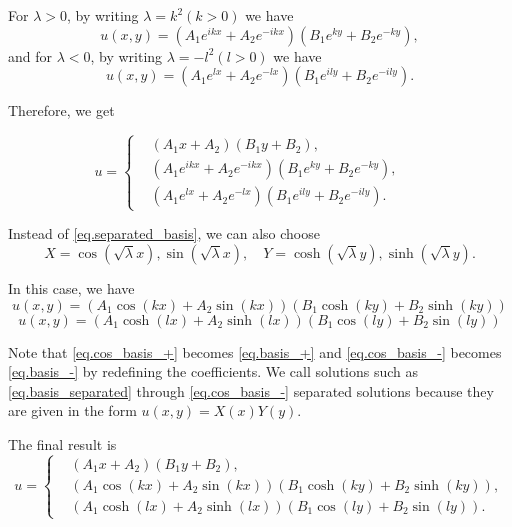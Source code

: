For $\lambda>0$, by writing $\lambda=k^2(k>0)$ we have
\begin{equation}\label{eq.basis_+}
u(x, y)=\left(A_1 e^{i k x}+A_2 e^{-i k x}\right)\left(B_1 e^{k y}+B_2 e^{-k y}\right),
\end{equation}
and for $\lambda<0$, by writing $\lambda=-l^2(l>0)$ we have
\begin{equation}\label{eq.basis_-}
u(x, y)=\left(A_1 e^{l x}+A_2 e^{-l x}\right)\left(B_1 e^{i l y}+B_2 e^{-i l y}\right) .
\end{equation}

Therefore, we get 

\begin{equation}\label{eq.basis_separated_+-}
u=
\left\{\begin{aligned}
&\left(A_1 x+A_2\right)\left(B_1 y+B_2\right), && 
\\
&\left(A_1 e^{i k x}+A_2 e^{-i k x}\right)\left(B_1 e^{k y}+B_2 e^{-k y}\right), && 
\\
&\left(A_1 e^{l x}+A_2 e^{-l x}\right)\left(B_1 e^{i l y}+B_2 e^{-i l y}\right).
\end{aligned}\right.
\end{equation}

Instead of \eqref{eq.separated_basis}, we can also choose
\begin{equation}
X=\cos (\sqrt{\lambda} x), \sin (\sqrt{\lambda} x), \quad Y=\cosh (\sqrt{\lambda} y), \sinh (\sqrt{\lambda} y) .
\end{equation}

In this case, we have
\begin{equation}\label{eq.cos_basis_+}
    u(x, y)=\left(A_1 \cos (k x)+A_2 \sin (k x)\right)\left(B_1 \cosh (k y)+B_2 \sinh (k y)\right)
\end{equation}
\begin{equation}\label{eq.cos_basis_-}
    u(x, y)=\left(A_1 \cosh (l x)+A_2 \sinh (l x)\right)\left(B_1 \cos (l y)+B_2 \sin (l y)\right)
\end{equation}

Note that \eqref{eq.cos_basis_+} becomes \eqref{eq.basis_+} and \eqref{eq.cos_basis_-} becomes \eqref{eq.basis_-} by redefining the coefficients. We call solutions such as \eqref{eq.basis_separated} through \eqref{eq.cos_basis_-} separated solutions because they are given in the form $u(x, y)=X(x) Y(y)$.

The final result is 
\begin{equation}\label{eq.basis_separated_final}
u=
\left\{\begin{aligned}
&\left(A_1 x+A_2\right)\left(B_1 y+B_2\right), 
\\
&\left(A_1 \cos (k x)+A_2 \sin (k x)\right)\left(B_1 \cosh (k y)+B_2 \sinh (k y)\right),
\\
&\left(A_1 \cosh (l x)+A_2 \sinh (l x)\right)\left(B_1 \cos (l y)+B_2 \sin (l y)\right).
\end{aligned}\right.
\end{equation}

